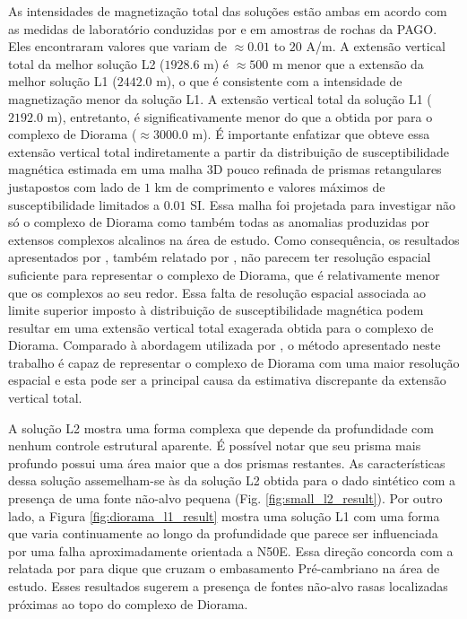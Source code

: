 As intensidades de magnetização total das soluções estão ambas em acordo com as medidas de laboratório conduzidas por \citet{dutra2011} e \citet{dutra_etal2014} 
em amostras de rochas da PAGO. Eles encontraram valores que variam de $\approx 0.01$ to $20$ A/m.
A extensão vertical total da melhor solução L2 ($1928.6$ m) é $\approx 500$ m 
menor que a extensão da melhor solução L1 ($2442.0$ m), o que é consistente com a intensidade de magnetização menor da solução L1.
A extensão vertical total da solução L1 ($2192.0$ m), entretanto, é significativamente menor do que a obtida por \citet[][Fig. 4.9, p. 78]{dutra2011} para o complexo de Diorama ($\approx 3000.0$ m). 
É importante enfatizar que \cite{dutra2011} obteve essa extensão vertical total indiretamente a partir da distribuição de susceptibilidade magnética estimada em uma malha 3D pouco refinada de prismas retangulares justapostos com lado de $1$ km de comprimento e valores máximos de susceptibilidade limitados a $0.01$ SI.
Essa malha foi projetada para investigar não só o complexo de Diorama como também todas as anomalias produzidas por extensos complexos alcalinos na área de estudo. Como consequência, os resultados apresentados por
\citet{dutra2011}, também relatado por \citet{marangoni_mantovani2013}, não parecem ter resolução espacial suficiente para representar o complexo de Diorama, que é relativamente menor que os complexos ao seu redor.
Essa falta de resolução espacial associada ao limite superior imposto à distribuição de susceptibilidade magnética podem resultar em uma extensão vertical total exagerada obtida para o complexo de Diorama.
Comparado à abordagem utilizada por \citet{dutra2011}, o método apresentado neste trabalho é capaz de representar o complexo de Diorama com uma maior resolução espacial e esta pode ser a principal causa da estimativa discrepante da extensão vertical total.

A solução L2 mostra uma forma complexa que depende da profundidade com nenhum controle estrutural aparente. É possível notar que seu prisma mais profundo possui uma área maior que a dos prismas restantes. As características dessa solução assemelham-se às da solução L2 obtida para o dado sintético com a presença de uma fonte não-alvo pequena (Fig. \ref{fig:small_l2_result}).
Por outro lado, a Figura \ref{fig:diorama_l1_result} mostra uma solução L1 com uma forma que varia continuamente ao longo da profundidade que parece ser influenciada por uma falha aproximadamente orientada a N50E. Essa direção concorda com a relatada por
\citet{junqueirabrod_etal2002} para dique que cruzam o embasamento Pré-cambriano na área de estudo.
Esses resultados sugerem a presença de fontes não-alvo rasas localizadas próximas ao topo do complexo de Diorama.


